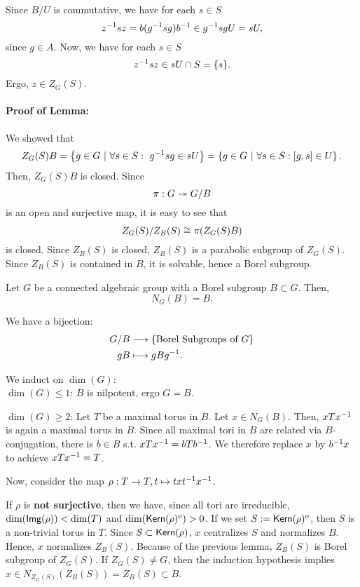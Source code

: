 Since $B/U$ is commutative, we have for each $s \in S$
\[ z^{-1} s z = b(g^{-1} s g)b^{-1} \in g^{-1} s g U= sU, \]
since $g \in A$.
Now, we have for each $s \in S$
\[ z^{-1} s z \in sU \cap S = \{s\}.  \]
Ergo, $z \in Z_G(S)$.


\paragraph{Proof of Lemma:} We showed that
\[ Z_G(S) B = \left\lbrace g \in G ~ | ~ \forall s \in S:~g^{-1} s g \in sU\right\rbrace = \left\lbrace g \in G ~ | ~ \forall s \in S:[g,s] \in U\right\rbrace. \]
Then, $Z_G(S)B$ is closed. Since
\[ \pi : G \overset{}{\twoheadrightarrow} G/B \]
is an open and surjective map, it is easy to see that
\[ Z_G(S) / Z_B(S) \overset{}{\cong} \pi(Z_G(S)B) \]
is closed. Since $Z_B(S)$ is closed, $Z_B(S)$ is a parabolic subgroup of $Z_G(S)$. Since $Z_B(S)$ is contained in $B$, it is solvable, hence a Borel subgroup.


\newpage

\begin{theorem}
	Let $G$ be a connected algebraic group with a Borel subgroup $B \subset G$. Then,
	\[ N_G(B) = B. \]
\end{theorem}
\begin{corollary}
	We have a bijection:
	\begin{align*}
	G/B & \overset{}{\longrightarrow} \left\lbrace\text{Borel Subgroups of }G\right\rbrace\\
	gB & \longmapsto gBg^{-1}.
	\end{align*}
\end{corollary}

\newpage
	We induct on $\dim(G)$:\\
	$\dim(G) \leq 1$: $B$ is nilpotent, ergo $G = B$.
	
	$\dim(G) \geq 2$:
	Let $T$ be a maximal torus in $B$. Let $x \in N_G(B)$.
	Then, $xTx^{-1}$ is again a maximal torus in $B$. Since all maximal tori in $B$ are related via $B$-conjugation, there is $b \in B$ s.t.
	$xTx^{-1} = bTb^{-1}$.
	We therefore replace $x$ by $b^{-1} x$ to achieve
	$ xTx^{-1} = T$.
	
	Now, consider the map
$\rho : T  \overset{}{\rightarrow} T, t \mapsto txt^{-1} x^{-1}$.

If $\rho$ is \textbf{not surjective}, then we have, since all tori are irreducible, $\dim(\textsf{Img}(\rho)) < \dim(T)$ and $\dim(\textsf{Kern}(\rho)^o)  >0$.
		If we set $S:=\textsf{Kern}(\rho)^o$, then $S$ is a non-trivial torus in $T$.
		Since $S \subset \textsf{Kern} (\rho)$, $x$ centralizes $S$ and normalizes $B$. Hence, $x$ normalizes $Z_B(S)$.
		Because of the previous lemma, $Z_B(S)$ is Borel subgroup of $Z_G(S)$. If $Z_G(S) \neq G$, then the induction hypothesis implies
		$ x \in N_{Z_G(S)}(Z_B(S)) = Z_B(S) \subset B$.
		
